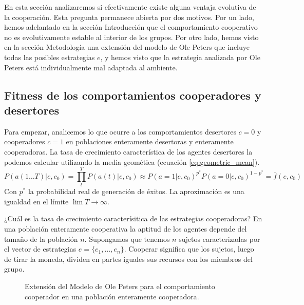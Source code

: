 \documentclass[a4paper,10pt]{article}
\begin{document}
En esta sección analizaremos si efectivamente existe alguna ventaja evolutiva de la cooperación.
Esta pregunta permanece abierta por dos motivos.
Por un lado, hemos adelantado en la sección Introducción que el comportamiento cooperativo no es evolutivamente estable al interior de los grupos.
Por otro lado, hemos visto en la sección Metodología una extensión del modelo de Ole Peters que incluye todas las posibles estrategias $e$, y hemos visto que la estrategia analizada por Ole Peters está individualmente mal adaptada al ambiente.

\subsection{Fitness de los comportamientos cooperadores y desertores}

Para empezar, analicemos lo que ocurre a los comportamientos desertores $c=0$ y cooperadores $c=1$ en poblaciones enteramente desertoras y enteramente cooperadoras.
La tasa de crecimiento característica de los agentes desertores la podemos calcular utilizando la media geomética (ecuación \ref{eq:geometric_mean}).
%
\begin{equation}\label{eq:des_temporal_average}
P(a(1\dots T)|e, c_0) = \prod_t^T P(a(t)|e,c_0) \approx  P(a=1|e,c_0)^{p^*} P(a=0|e,c_0)^{1-p^*} = \overline{f}(e,c_0)
\end{equation}
%
Con $p^*$ la probabilidad real de generación de éxitos.
La aproximación es una igualdad en el límite $\lim T \rightarrow \infty$.


¿Cuál es la tasa de crecimiento caracterísitica de las estrategias cooperadoras?
En una población enteramente cooperativa la aptitud de los agentes depende del tamaño de la población $n$.
Supongamos que tenemos $n$ sujetos caracterizadas por el vector de estrategias $e = \{e_1, \dots, e_n\}$.
Cooperar significa que los sujetos, luego de tirar la moneda, dividen en partes iguales sus recursos con los miembros del grupo.
%
\begin{figure}[H]
\centering
{}
\caption{Extensión del Modelo de Ole Peters para el comportamiento cooperador en una población enteramente cooperadora.}
\label{fig:modelo_cooperativo}
\end{figure}
%
\end{document}
